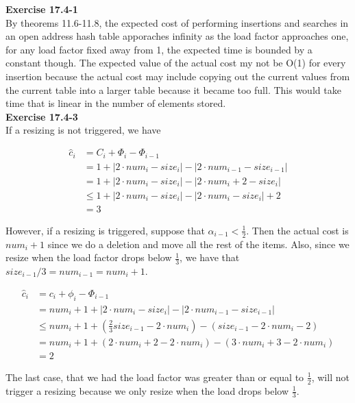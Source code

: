 \documentclass{article}
\begin{document}
\noindent\textbf{Exercise 17.4-1}\\
By theorems 11.6-11.8, the expected cost of performing insertions and searches in an open address hash table apporaches infinity as the load factor approaches one, for any load factor fixed away from 1, the expected time is bounded by a constant though. The expected value of the actual cost my not be O(1) for every insertion because the actual cost may include copying out the current values from the current table into a larger table because it became too full. This would take time that is linear in the number of elements stored.\\

\noindent\textbf{Exercise 17.4-3}\\
If a resizing is not triggered, we have

\begin{align*}
\hat{c}_i & = C_i + \Phi_i-\Phi_{i-1}\\
&= 1 + |2\cdot num_i - size_i| - |2\cdot num_{i-1} - size_{i-1}|\\
&= 1 + |2\cdot num_i - size_i| - |2\cdot num_i + 2  - size_{i}|\\
&\le 1 + |2\cdot num_i - size_i| - |2\cdot num_i  - size_{i}| + 2\\
&= 3
\end{align*}

However, if a resizing is triggered, suppose that $\alpha_{i-1} <\frac{1}{2}$. Then the actual cost is $num_i+1$ since we do a deletion and move all the rest of the items. Also, since we resize when the load factor drops below $\frac{1}{3}$, we have that $size_{i-1}/3 = num_{i-1} = num_i +1$.

\begin{align*}
\hat{c}_i &= c_i + \phi_i - \Phi_{i-1}\\
&= num_i + 1 + |2\cdot num_i -size_i| - |2\cdot num_{i-1} - size_{i-1}|\\
&\le num_i + 1 + \left(\frac{2}{3}size_{i-1}- 2\cdot num_i\right) - (size_{i-1} - 2\cdot num_i -2 ) \\
&=num_i + 1 + (2\cdot num_i +2 - 2\cdot num_i) - (3\cdot num_i +3 -2\cdot num_i)\\
&= 2
\end{align*}

The last case, that we had the load factor was greater than or equal to $\frac{1}{2}$, will not trigger a resizing because we only resize when the load drops below $\frac{1}{3}$.\\
\end{document}
